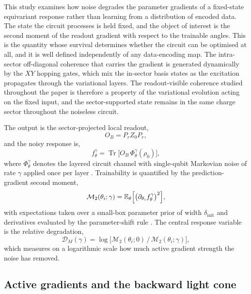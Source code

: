 \documentclass[10pt,a4paper]{amsart}
\newcommand{\Mtwo}{\mathcal{M}_2}
\newcommand{\DM}{\mathcal{D}_M}
\newcommand{\Tr}{\operatorname{Tr}}
\begin{document}
This study examines how noise degrades the parameter gradients of a fixed-state equivariant response rather than learning from a distribution of encoded data. The state the circuit processes is held fixed, and the object of interest is the second moment of the readout gradient with respect to the trainable angles. This is the quantity whose survival determines whether the circuit can be optimised at all, and it is well defined independently of any data-encoding map. The intra-sector off-diagonal coherence that carries the gradient is generated dynamically by the $XY$ hopping gates, which mix the in-sector basis states as the excitation propagates through the variational layers. The readout-visible coherence studied throughout the paper is therefore a property of the variational evolution acting on the fixed input, and the sector-supported state remains in the same charge sector throughout the noiseless circuit.

The output is the sector-projected local readout,
\begin{equation}
    O_B = P_r Z_0 P_r ,
    \label{eq:readout}
\end{equation}
and the noisy response is,
\begin{equation}
    f^\gamma_\theta=\Tr\!\bigl[O_B\,\Phi^\gamma_\theta(\rho_0)\bigr],
    \label{eq:prediction}
\end{equation}
where $\Phi^\gamma_\theta$ denotes the layered circuit channel with single-qubit Markovian noise of rate $\gamma$ applied once per layer \cite{lindblad1976,gks1976,breuerpetruccione2002}. Trainability is quantified by the prediction-gradient second moment,
\begin{equation}
    \Mtwo(\theta_i;\gamma)
    =
    \mathbb{E}_{\theta}
    \Bigl[\bigl(\partial_{\theta_i}f^\gamma_\theta\bigr)^2\Bigr],
    \label{eq:m2pred}
\end{equation}
with expectations taken over a small-box parameter prior of width $\delta_{\mathrm{init}}$ \cite{grant2019} and derivatives evaluated by the parameter-shift rule \cite{mitarai2018,schuld2019,wierichs2022}. The central response variable is the relative degradation,
\begin{equation}
    \DM(\gamma)
    =
    \log\!\bigl[\Mtwo(\theta_i;0)\,/\,\Mtwo(\theta_i;\gamma)\bigr],
    \label{eq:dm}
\end{equation}
which measures on a logarithmic scale how much active gradient strength the noise has removed.

\subsection{Active gradients and the backward light cone}\label{sec:lightcone}
\end{document}
